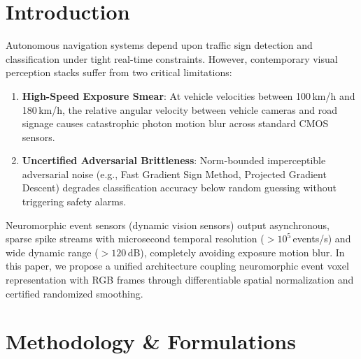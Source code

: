 \documentclass[journal,twocolumn,letterpaper]{IEEEtran}
\begin{document}
\section{Introduction}
Autonomous navigation systems depend upon traffic sign detection and classification under tight real-time constraints. However, contemporary visual perception stacks suffer from two critical limitations:
\begin{enumerate}
    \item \textbf{High-Speed Exposure Smear}: At vehicle velocities between 100\,km/h and 180\,km/h, the relative angular velocity between vehicle cameras and road signage causes catastrophic photon motion blur across standard CMOS sensors.
    \item \textbf{Uncertified Adversarial Brittleness}: Norm-bounded imperceptible adversarial noise (e.g., Fast Gradient Sign Method, Projected Gradient Descent) degrades classification accuracy below random guessing without triggering safety alarms.
\end{enumerate}

Neuromorphic event sensors (dynamic vision sensors) output asynchronous, sparse spike streams with microsecond temporal resolution ($>10^5$\,events/s) and wide dynamic range ($>120$\,dB), completely avoiding exposure motion blur. In this paper, we propose a unified architecture coupling neuromorphic event voxel representation with RGB frames through differentiable spatial normalization and certified randomized smoothing.

\section{Methodology \& Formulations}
\end{document}
